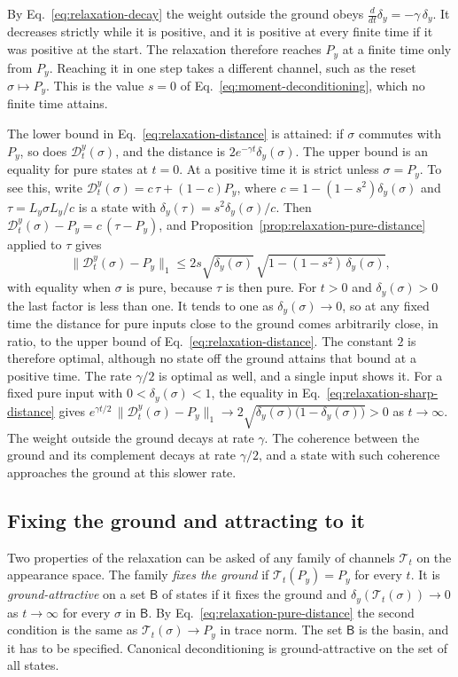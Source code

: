 \documentclass[11pt]{article}
\theoremstyle{definition}
\begin{document}
By Eq.~\eqref{eq:relaxation-decay} the weight outside the ground obeys $\tfrac{d}{dt}\delta_y=-\gamma\,\delta_y$. It decreases strictly while it is positive, and it is positive at every finite time if it was positive at the start. The relaxation therefore reaches $P_y$ at a finite time only from $P_y$. Reaching it in one step takes a different channel, such as the reset $\sigma\mapsto P_y$. This is the value $s=0$ of Eq.~\eqref{eq:moment-deconditioning}, which no finite time attains.

The lower bound in Eq.~\eqref{eq:relaxation-distance} is attained: if $\sigma$ commutes with $P_y$, so does $\mathcal D_t^y(\sigma)$, and the distance is $2e^{-\gamma t}\delta_y(\sigma)$. The upper bound is an equality for pure states at $t=0$. At a positive time it is strict unless $\sigma=P_y$. To see this, write $\mathcal D_t^y(\sigma)=c\,\tau+(1-c)P_y$, where $c=1-(1-s^2)\delta_y(\sigma)$ and $\tau=L_y\sigma L_y/c$ is a state with $\delta_y(\tau)=s^2\delta_y(\sigma)/c$. Then $\mathcal D_t^y(\sigma)-P_y=c\,(\tau-P_y)$, and Proposition~\ref{prop:relaxation-pure-distance} applied to $\tau$ gives
\begin{equation}
 \bigl\|\mathcal D_t^y(\sigma)-P_y\bigr\|_1
 \le2s\sqrt{\delta_y(\sigma)}\,\sqrt{1-(1-s^2)\,\delta_y(\sigma)},
 \label{eq:relaxation-sharp-distance}
\end{equation}
with equality when $\sigma$ is pure, because $\tau$ is then pure. For $t>0$ and $\delta_y(\sigma)>0$ the last factor is less than one. It tends to one as $\delta_y(\sigma)\to0$, so at any fixed time the distance for pure inputs close to the ground comes arbitrarily close, in ratio, to the upper bound of Eq.~\eqref{eq:relaxation-distance}. The constant $2$ is therefore optimal, although no state off the ground attains that bound at a positive time. The rate $\gamma/2$ is optimal as well, and a single input shows it. For a fixed pure input with $0<\delta_y(\sigma)<1$, the equality in Eq.~\eqref{eq:relaxation-sharp-distance} gives $e^{\gamma t/2}\,\|\mathcal D_t^y(\sigma)-P_y\|_1\to2\sqrt{\delta_y(\sigma)\bigl(1-\delta_y(\sigma)\bigr)}>0$ as $t\to\infty$. The weight outside the ground decays at rate $\gamma$. The coherence between the ground and its complement decays at rate $\gamma/2$, and a state with such coherence approaches the ground at this slower rate.

\subsection{Fixing the ground and attracting to it}
\label{subsec:relaxation-unitary}
Two properties of the relaxation can be asked of any family of channels $\mathcal T_t$ on the appearance space. The family \emph{fixes the ground} if $\mathcal T_t(P_y)=P_y$ for every $t$. It is \emph{ground-attractive} on a set $\mathsf B$ of states if it fixes the ground and $\delta_y(\mathcal T_t(\sigma))\to0$ as $t\to\infty$ for every $\sigma$ in $\mathsf B$. By Eq.~\eqref{eq:relaxation-pure-distance} the second condition is the same as $\mathcal T_t(\sigma)\to P_y$ in trace norm. The set $\mathsf B$ is the basin, and it has to be specified. Canonical deconditioning is ground-attractive on the set of all states.
\end{document}
